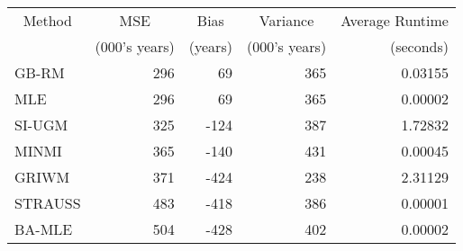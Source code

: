 
\begin{tabular}{lrrrr}
\toprule
\multicolumn{1}{c}{Method} & \multicolumn{1}{c}{MSE} & \multicolumn{1}{c}{Bias} & \multicolumn{1}{c}{Variance} & \multicolumn{1}{c}{Average Runtime} \\
\cmidrule(l{3pt}r{3pt}){1-1} \cmidrule(l{3pt}r{3pt}){2-2} \cmidrule(l{3pt}r{3pt}){3-3} \cmidrule(l{3pt}r{3pt}){4-4} \cmidrule(l{3pt}r{3pt}){5-5}
 & (000's years) & (years) & (000's years) & (seconds)\\
\midrule
GB-RM & 296 & 69 & 365 & 0.03155\\
MLE & 296 & 69 & 365 & 0.00002\\
SI-UGM & 325 & -124 & 387 & 1.72832\\
MINMI & 365 & -140 & 431 & 0.00045\\
GRIWM & 371 & -424 & 238 & 2.31129\\
\addlinespace
STRAUSS & 483 & -418 & 386 & 0.00001\\
BA-MLE & 504 & -428 & 402 & 0.00002\\
\bottomrule
\end{tabular}
